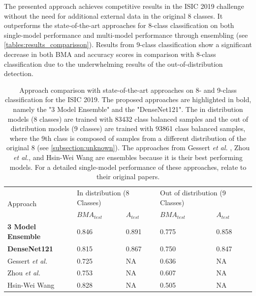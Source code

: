     The presented approach achieves competitive results in the \ac{ISIC} 2019 challenge without the need for additional external data in the original 8 classes. It outperforms the state-of-the-art approaches for 8-class classification on both single-model performance and multi-model performance through ensembling (see \autoref{tables:results_comparisson}). Results from 9-class classification show a significant decrease in both \ac{BMA} and accuracy scores in comparison with 8-class classification due to the underwhelming results of the out-of-distribution detection.  \par
    
    \begin{table}[h]
        \centering
        \begin{tabularx}{\textwidth}{|l|X|X|X|X|}
            \hline
            \multirow{2}{*}{Approach} & \multicolumn{2}{l|}{In distribution (8 Classes)} & \multicolumn{2}{l|}{Out of distribution (9 Classes)} \\ \cline{2-5} &                         $BMA_{test}$ & $A_{test}$ & $BMA_{test}$ & $A_{test}$ \\ \hline
            \textbf{3 Model Ensemble} &                         0.846 & 0.891 & 0.775    &  0.858     \\ \hline
            \textbf{DenseNet121} &                              0.815     & 0.867     & 0.750    & 0.847     \\ \hline
            Gessert \textit{et al.} \cite{isic2019first} &        0.725 & NA     & 0.636 & NA     \\ \hline
            Zhou \textit{et al.} \cite{isic2019second} &        0.753 & NA     & 0.607 & NA     \\ \hline
            Hsin-Wei Wang \cite{Wang} &                0.828 & NA     & 0.505 & NA     \\ \hline
        \end{tabularx}
        \caption[Approach comparison with state-of-the-art approaches on 8- and 9-class classification for the \ac{ISIC} 2019.] {Approach comparison with state-of-the-art approaches on 8- and 9-class classification for the \ac{ISIC} 2019. The proposed approaches are highlighted in bold, namely the "3 Model Ensemble" and the "DenseNet121". The in distribution models (8 classes) are trained with 83432 class balanced samples and the out of distribution models (9 classes) are trained with 93861 class balanced samples, where the 9th class is composed of samples from a different distribution of the original 8 (see \autoref{subsection:unknown}). The approaches from Gessert \textit{et al.} \cite{isic2019first}, Zhou \textit{et al.}, and Hsin-Wei Wang \cite{Wang} are ensembles because it is their best performing models. For a detailed single-model performance of these approaches, relate to their original papers.}
        \label{tables:results_comparisson}
    \end{table} 
    

